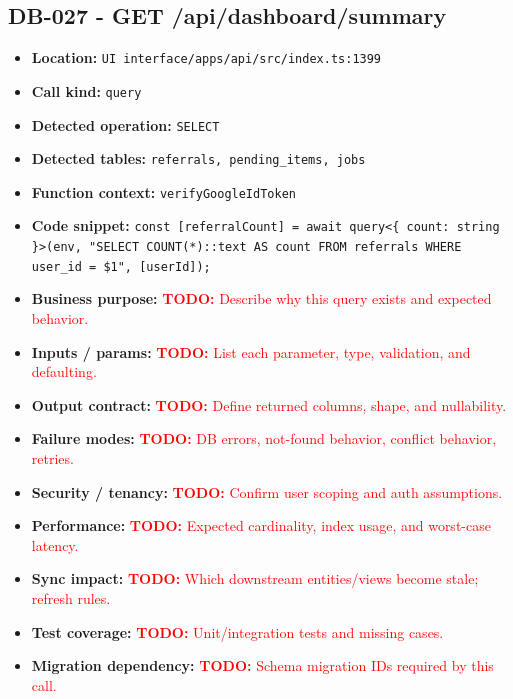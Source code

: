 \documentclass[11pt]{article}
\newcommand{\todoitem}[1]{\textcolor{red}{\textbf{TODO:} #1}}
\begin{document}
\subsection{DB-027 - GET /api/dashboard/summary}
\begin{itemize}[leftmargin=1.5em]
\item \textbf{Location:} \texttt{UI interface/apps/api/src/index.ts:1399}
\item \textbf{Call kind:} \texttt{query}
\item \textbf{Detected operation:} \texttt{SELECT}
\item \textbf{Detected tables:} \texttt{referrals, pending\_items, jobs}
\item \textbf{Function context:} \texttt{verifyGoogleIdToken}
\item \textbf{Code snippet:} \texttt{const [referralCount] = await query<\{ count: string \}>(env, "SELECT COUNT(*)::text AS count FROM referrals WHERE user\_id = \$1", [userId]);}
\item \textbf{Business purpose:} \todoitem{Describe why this query exists and expected behavior.}
\item \textbf{Inputs / params:} \todoitem{List each parameter, type, validation, and defaulting.}
\item \textbf{Output contract:} \todoitem{Define returned columns, shape, and nullability.}
\item \textbf{Failure modes:} \todoitem{DB errors, not-found behavior, conflict behavior, retries.}
\item \textbf{Security / tenancy:} \todoitem{Confirm user scoping and auth assumptions.}
\item \textbf{Performance:} \todoitem{Expected cardinality, index usage, and worst-case latency.}
\item \textbf{Sync impact:} \todoitem{Which downstream entities/views become stale; refresh rules.}
\item \textbf{Test coverage:} \todoitem{Unit/integration tests and missing cases.}
\item \textbf{Migration dependency:} \todoitem{Schema migration IDs required by this call.}
\end{itemize}
\end{document}
